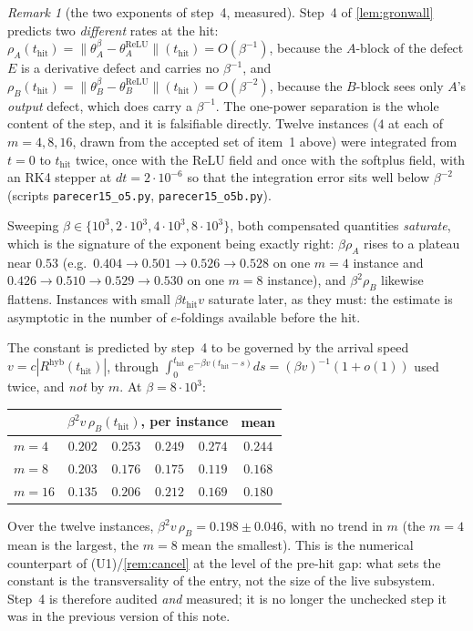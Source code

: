 \documentclass[11pt]{article}
\theoremstyle{definition}
\theoremstyle{remark}
\newtheorem{remark}{Remark}
\newcommand{\hyb}{\mathrm{hyb}}
\newcommand{\thit}{t_{\mathrm{hit}}}
\begin{document}
\begin{remark}[the two exponents of step~4, measured]\label{rem:o5num}
Step~4 of \cref{lem:gronwall} predicts two \emph{different} rates at the hit:
$\rho_A(\thit)=\|\theta_A^\beta-\theta_A^{\mathrm{ReLU}}\|(\thit)=O(\beta^{-1})$,
because the $A$-block of the defect $E$ is a derivative defect and carries no
$\beta^{-1}$, and
$\rho_B(\thit)=\|\theta_B^\beta-\theta_B^{\mathrm{ReLU}}\|(\thit)=O(\beta^{-2})$,
because the $B$-block sees only $A$'s \emph{output} defect, which does carry a
$\beta^{-1}$. The one-power separation is the whole content of the step, and it
is falsifiable directly. Twelve instances ($4$ at each of $m=4,8,16$, drawn from
the accepted set of item~1 above) were integrated from $t=0$ to $\thit$ twice,
once with the ReLU field and once with the softplus field, with an RK4 stepper at
$dt=2\cdot10^{-6}$ so that the integration error sits well below $\beta^{-2}$
(scripts \texttt{parecer15\_o5.py}, \texttt{parecer15\_o5b.py}).

Sweeping $\beta\in\{10^3,2\cdot10^3,4\cdot10^3,8\cdot10^3\}$, both compensated
quantities \emph{saturate}, which is the signature of the exponent being exactly
right: $\beta\rho_A$ rises to a plateau near $0.53$ (e.g.\ $0.404\to0.501\to
0.526\to0.528$ on one $m=4$ instance and $0.426\to0.510\to0.529\to0.530$ on one
$m=8$ instance), and $\beta^2\rho_B$ likewise flattens. Instances with small
$\beta\thit v$ saturate later, as they must: the estimate is asymptotic in the
number of $e$-foldings available before the hit.

The constant is predicted by step~4 to be governed by the arrival speed
$v=c|R^{\hyb}(\thit)|$, through
$\int_0^{\thit}e^{-\beta v(\thit-s)}ds=(\beta v)^{-1}(1+o(1))$ used twice, and
\emph{not} by $m$. At $\beta=8\cdot10^3$:
\begin{center}
\small
\begin{tabular}{lcccc|c}
\hline
& \multicolumn{4}{c|}{$\beta^2 v\,\rho_B(\thit)$, per instance} & mean\\
\hline
$m=4$ & $0.202$ & $0.253$ & $0.249$ & $0.274$ & $0.244$\\
$m=8$ & $0.203$ & $0.176$ & $0.175$ & $0.119$ & $0.168$\\
$m=16$ & $0.135$ & $0.206$ & $0.212$ & $0.169$ & $0.180$\\
\hline
\end{tabular}
\end{center}
\noindent Over the twelve instances, $\beta^2v\,\rho_B=0.198\pm0.046$, with no
trend in $m$ (the $m=4$ mean is the largest, the $m=8$ mean the smallest). This
is the numerical counterpart of (U1)/\cref{rem:cancel} at the level of the
pre-hit gap: what sets the constant is the transversality of the entry, not the
size of the live subsystem. Step~4 is therefore audited \emph{and} measured; it
is no longer the unchecked step it was in the previous version of this note.
\end{remark}
\end{document}
